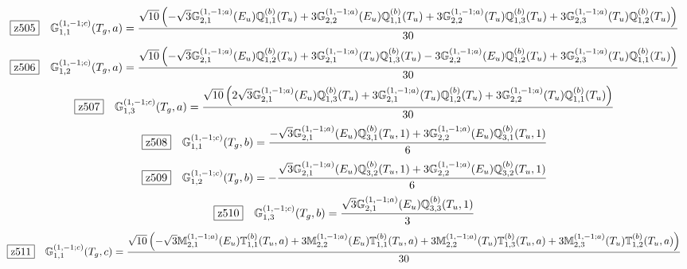 \documentclass[fleqn,10pt,landscape]{jsarticle}
\begin{document}
\begin{dmath*}
\hspace*{3mm}\fbox{z505}\quad \mathbb{G}_{1,1}^{(1,-1;c)}(T_{g},a)=\frac{\sqrt{10} \left(- \sqrt{3} \mathbb{G}_{2,1}^{(1,-1;a)}(E_{u}) \mathbb{Q}_{1,1}^{(b)}(T_{u}) + 3 \mathbb{G}_{2,2}^{(1,-1;a)}(E_{u}) \mathbb{Q}_{1,1}^{(b)}(T_{u}) + 3 \mathbb{G}_{2,2}^{(1,-1;a)}(T_{u}) \mathbb{Q}_{1,3}^{(b)}(T_{u}) + 3 \mathbb{G}_{2,3}^{(1,-1;a)}(T_{u}) \mathbb{Q}_{1,2}^{(b)}(T_{u})\right)}{30}
\end{dmath*}
\begin{dmath*}
\hspace*{3mm}\fbox{z506}\quad \mathbb{G}_{1,2}^{(1,-1;c)}(T_{g},a)=\frac{\sqrt{10} \left(- \sqrt{3} \mathbb{G}_{2,1}^{(1,-1;a)}(E_{u}) \mathbb{Q}_{1,2}^{(b)}(T_{u}) + 3 \mathbb{G}_{2,1}^{(1,-1;a)}(T_{u}) \mathbb{Q}_{1,3}^{(b)}(T_{u}) - 3 \mathbb{G}_{2,2}^{(1,-1;a)}(E_{u}) \mathbb{Q}_{1,2}^{(b)}(T_{u}) + 3 \mathbb{G}_{2,3}^{(1,-1;a)}(T_{u}) \mathbb{Q}_{1,1}^{(b)}(T_{u})\right)}{30}
\end{dmath*}
\begin{dmath*}
\hspace*{3mm}\fbox{z507}\quad \mathbb{G}_{1,3}^{(1,-1;c)}(T_{g},a)=\frac{\sqrt{10} \left(2 \sqrt{3} \mathbb{G}_{2,1}^{(1,-1;a)}(E_{u}) \mathbb{Q}_{1,3}^{(b)}(T_{u}) + 3 \mathbb{G}_{2,1}^{(1,-1;a)}(T_{u}) \mathbb{Q}_{1,2}^{(b)}(T_{u}) + 3 \mathbb{G}_{2,2}^{(1,-1;a)}(T_{u}) \mathbb{Q}_{1,1}^{(b)}(T_{u})\right)}{30}
\end{dmath*}
\begin{dmath*}
\hspace*{3mm}\fbox{z508}\quad \mathbb{G}_{1,1}^{(1,-1;c)}(T_{g},b)=\frac{- \sqrt{3} \mathbb{G}_{2,1}^{(1,-1;a)}(E_{u}) \mathbb{Q}_{3,1}^{(b)}(T_{u},1) + 3 \mathbb{G}_{2,2}^{(1,-1;a)}(E_{u}) \mathbb{Q}_{3,1}^{(b)}(T_{u},1)}{6}
\end{dmath*}
\begin{dmath*}
\hspace*{3mm}\fbox{z509}\quad \mathbb{G}_{1,2}^{(1,-1;c)}(T_{g},b)=- \frac{\sqrt{3} \mathbb{G}_{2,1}^{(1,-1;a)}(E_{u}) \mathbb{Q}_{3,2}^{(b)}(T_{u},1) + 3 \mathbb{G}_{2,2}^{(1,-1;a)}(E_{u}) \mathbb{Q}_{3,2}^{(b)}(T_{u},1)}{6}
\end{dmath*}
\begin{dmath*}
\hspace*{3mm}\fbox{z510}\quad \mathbb{G}_{1,3}^{(1,-1;c)}(T_{g},b)=\frac{\sqrt{3} \mathbb{G}_{2,1}^{(1,-1;a)}(E_{u}) \mathbb{Q}_{3,3}^{(b)}(T_{u},1)}{3}
\end{dmath*}
\begin{dmath*}
\hspace*{3mm}\fbox{z511}\quad \mathbb{G}_{1,1}^{(1,-1;c)}(T_{g},c)=\frac{\sqrt{10} \left(- \sqrt{3} \mathbb{M}_{2,1}^{(1,-1;a)}(E_{u}) \mathbb{T}_{1,1}^{(b)}(T_{u},a) + 3 \mathbb{M}_{2,2}^{(1,-1;a)}(E_{u}) \mathbb{T}_{1,1}^{(b)}(T_{u},a) + 3 \mathbb{M}_{2,2}^{(1,-1;a)}(T_{u}) \mathbb{T}_{1,3}^{(b)}(T_{u},a) + 3 \mathbb{M}_{2,3}^{(1,-1;a)}(T_{u}) \mathbb{T}_{1,2}^{(b)}(T_{u},a)\right)}{30}
\end{dmath*}
\end{document}
